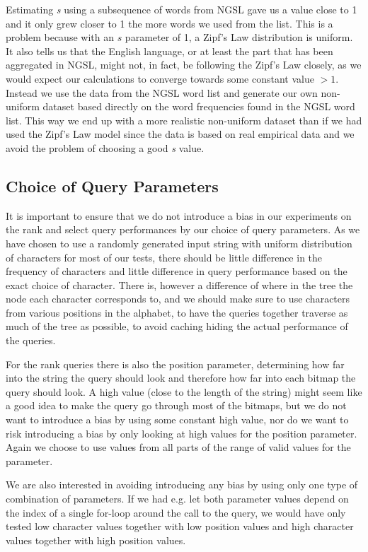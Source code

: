 Estimating \textit{s} using a subsequence of words from NGSL gave us a value close to 1 and it only grew closer to 1 the more words we used from the list.
This is a problem because with an $s$ parameter of 1, a Zipf's Law distribution is uniform.
It also tells us that the English language, or at least the part that has been aggregated in NGSL, might not, in fact, be following the Zipf's Law closely, as we would expect our calculations to converge towards some constant value $>1$.
Instead we use the data from the NGSL word list and generate our own non-uniform dataset based directly on the word frequencies found in the NGSL word list.
This way we end up with a more realistic non-uniform dataset than if we had used the Zipf's Law model since the data is based on real empirical data and we avoid the problem of choosing a good \textit{s} value.


\subsection{Choice of Query Parameters}
\label{sec:choiceOfQueryParameters}
It is important to ensure that we do not introduce a bias in our experiments on the rank and select query performances by our choice of query parameters.
As we have chosen to use a randomly generated input string with uniform distribution of characters for most of our tests, there should be little difference in the frequency of characters and little difference in query performance based on the exact choice of character.
There is, however a difference of where in the tree the node each character corresponds to, and we should make sure to use characters from various positions in the alphabet, to have the queries together traverse as much of the tree as possible, to avoid caching hiding the actual performance of the queries.

For the rank queries there is also the position parameter, determining how far into the string the query should look and therefore how far into each bitmap the query should look.
A high value (close to the length of the string) might seem like a good idea to make the query go through most of the bitmaps, but we do not want to introduce a bias by using some constant high value, nor do we want to risk introducing a bias by only looking at high values for the position parameter.
Again we choose to use values from all parts of the range of valid values for the parameter.

We are also interested in avoiding introducing any bias by using only one type of combination of parameters.
If we had e.g. let both parameter values depend on the index of a single for-loop around the call to the query, we would have only tested low character values together with low position values and high character values together with high position values.

